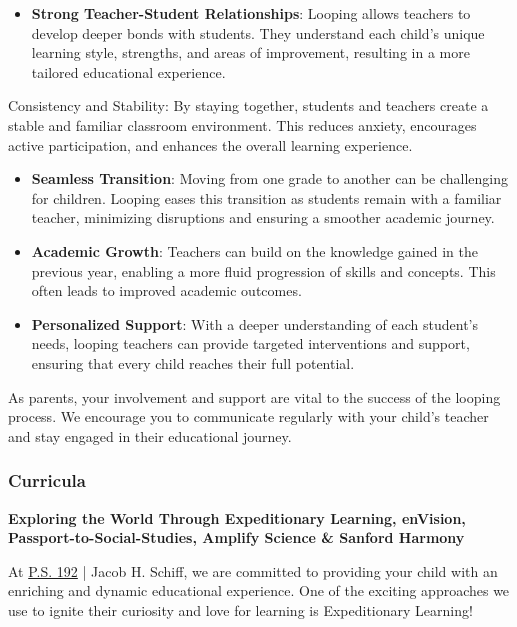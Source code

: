 \documentclass[11pt]{article}
\begin{document}
\begin{itemize}
\item \textbf{Strong Teacher-Student Relationships}: Looping allows teachers to develop deeper bonds with students. They understand each child's unique learning style, strengths, and areas of improvement, resulting in a more tailored educational experience.
\end{itemize}
Consistency and Stability: By staying together, students and teachers create a stable and familiar classroom environment. This reduces anxiety, encourages active participation, and enhances the overall learning experience.
\begin{itemize}
\item \textbf{Seamless Transition}: Moving from one grade to another can be challenging for children. Looping eases this transition as students remain with a familiar teacher, minimizing disruptions and ensuring a smoother academic journey.
\item \textbf{Academic Growth}: Teachers can build on the knowledge gained in the previous year, enabling a more fluid progression of skills and concepts. This often leads to improved academic outcomes.
\item \textbf{Personalized Support}: With a deeper understanding of each student's needs, looping teachers can provide targeted interventions and support, ensuring that every child reaches their full potential.
\end{itemize}

As parents, your involvement and support are vital to the success of the looping process. We encourage you to communicate regularly with your child's teacher and stay engaged in their educational journey.

\subsubsection{Curricula}
\label{sec:org44d36e3}
\textbf{Exploring the World Through Expeditionary Learning, enVision, Passport-to-Social-Studies, Amplify Science \& Sanford Harmony}

At \href{https://www.ps192.org}{P.S. 192} | Jacob H. Schiff, we are committed to providing your child with an enriching and dynamic educational experience. One of the exciting approaches we use to ignite their curiosity and love for learning is Expeditionary Learning!
\end{document}
